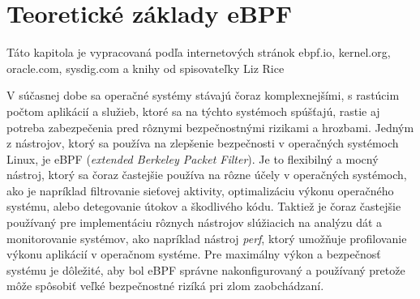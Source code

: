 \section{Teoretické základy eBPF}
Táto kapitola je vypracovaná podľa internetových stránok ebpf.io, kernel.org, oracle.com, sysdig.com a knihy od spisovateľky Liz Rice~\cite{eBPF, kernel, oracle, history, book1, B.Gregg}

V súčasnej dobe sa operačné systémy stávajú čoraz komplexnejšími, s rastúcim počtom aplikácií a služieb, ktoré sa na týchto systémoch spúšťajú, 
rastie aj potreba zabezpečenia pred rôznymi bezpečnostnými rizikami a hrozbami. Jedným z nástrojov, ktorý sa používa na zlepšenie bezpečnosti v 
operačných systémoch Linux, je eBPF (\emph{extended Berkeley Packet Filter}). Je to flexibilný a mocný nástroj, ktorý sa čoraz častejšie používa na 
rôzne účely v operačných systémoch, ako je napríklad filtrovanie sieťovej aktivity, optimalizáciu výkonu operačného systému, 
alebo detegovanie útokov a škodlivého kódu. Taktiež je čoraz častejšie používaný pre implementáciu rôznych nástrojov slúžiacich na analýzu dát 
a monitorovanie systémov, ako napríklad nástroj \emph{perf}, ktorý umožňuje profilovanie výkonu aplikácií v operačnom systéme. Pre maximálny výkon a 
bezpečnosť systému je dôležité, aby bol eBPF správne nakonfigurovaný a používaný pretože môže spôsobiť veľké bezpečnostné rizíká pri zlom zaobchádzaní.

